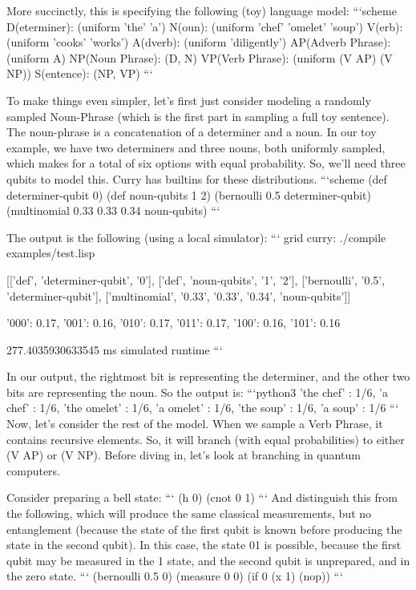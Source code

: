 \documentclass[journal]{IEEEtran}
\begin{document}
 More succinctly, this is specifying the following (toy) language model:
 ```scheme
 D(eterminer):      (uniform 'the' 'a')
 N(oun):            (uniform 'chef' 'omelet' 'soup')
 V(erb):            (uniform 'cooks' 'works')
 A(dverb):          (uniform 'diligently')
 AP(Adverb Phrase): (uniform A)
 NP(Noun Phrase):   (D, N)
 VP(Verb Phrase):   (uniform (V AP) (V NP))
 S(entence):        (NP, VP)
 ```
 
 To make things even simpler, let's first just consider modeling a randomly sampled Noun-Phrase (which is the first part in sampling a full toy sentence).
 The noun-phrase is a concatenation of a determiner and a noun. In our toy example, we have two determiners and three nouns, both uniformly sampled, which makes for a total of six options with equal probability.
 So, we'll need three qubits to model this. Curry has builtins for these distributions.
 ```scheme
 (def determiner-qubit 0)
 (def noun-qubits 1 2)
 (bernoulli 0.5 determiner-qubit)
 (multinomial 0.33 0.33 0.34 noun-qubits)
 ```
 
 The output is the following (using a local simulator):
 ```
 grid {curry}: ./compile examples/test.lisp
 
 [['def', 'determiner-qubit', '0'],
  ['def', 'noun-qubits', '1', '2'],
  ['bernoulli', '0.5', 'determiner-qubit'],
  ['multinomial', '0.33', '0.33', '0.34', 'noun-qubits']]
 
 {'000': 0.17, '001': 0.16, '010': 0.17, '011': 0.17, '100': 0.16, '101': 0.16}
 
 277.4035930633545 ms simulated runtime
 ```
 
 In our output, the rightmost bit is representing the determiner, and the other two bits are representing the noun.
 So the output is:
 ```python3
 {'the chef' : 1/6, 'a chef' : 1/6, 'the omelet' : 1/6, 'a omelet' : 1/6, 'the soup' : 1/6, 'a soup' : 1/6}
 ```
 Now, let's consider the rest of the model.
 When we sample a Verb Phrase, it contains recursive elements.
 So, it will branch (with equal probabilities) to either (V AP) or (V NP).
 Before diving in, let's look at branching in quantum computers.
 
 Consider preparing a bell state:
 ```
 (h 0)
 (cnot 0 1)
 ```
 And distinguish this from the following, which will produce the same classical measurements, but no entanglement (because the state of the first qubit is known before producing the state in the second qubit). 
 In this case, the state 01 is possible, because the first qubit may be measured in the 1 state, and the second qubit is unprepared, and in the zero state.
 ```
 (bernoulli 0.5 0)
 (measure 0 0)
 (if 0 (x 1) (nop))
 ```
 
\end{document}
